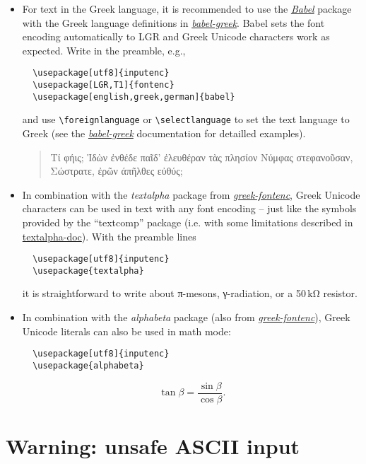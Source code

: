 \documentclass[a4paper]{article}
\begin{document}
{\begin{itemize}
\item
For text in the Greek language, it is recommended to use the
\href{http://www.ctan.org/pkg/babel}{\emph{Babel}} package with the Greek
language definitions in
\href{http://www.ctan.org/pkg/babel-greek}{\emph{babel-greek}}. Babel sets
the font encoding automatically to LGR and Greek Unicode characters work as
expected. Write in the preamble, e.g.,
%
\begin{verbatim}
  \usepackage[utf8]{inputenc}
  \usepackage[LGR,T1]{fontenc}
  \usepackage[english,greek,german]{babel}
\end{verbatim}
%
and use \verb+\foreignlanguage+ or \verb+\selectlanguage+ to set the text
language to Greek (see the
\href{http://www.ctan.org/pkg/babel-greek}{\emph{babel-greek}} documentation
for detailled examples).

\begin{quote}
  \greekscript
  Τί φήις; Ἱδὼν ἐνθέδε παῖδ’ ἐλευθέραν
  τὰς πλησίον Νύμφας στεφανοῦσαν, Σώστρατε,
  ἐρῶν άπῆλθες εὐθύς;
\end{quote}

\item
In combination with the \emph{textalpha} package from
\href{http://www.ctan.org/pkg/greek-fontenc}{\emph{greek-fontenc}}, Greek Unicode
characters can be used in text with any font encoding -- just like the
symbols provided by the ``textcomp'' package (i.e. with some limitations
described in
\href{http://mirrors.ctan.org/language/greek/greek-fontenc/textalpha-doc.pdf}%
{textalpha-doc}). With the preamble lines
%
\begin{verbatim}
  \usepackage[utf8]{inputenc}
  \usepackage{textalpha}
\end{verbatim}
%
it is straightforward to write about π-mesons, γ-radiation, or a 50\,kΩ
resistor.

\item
In combination with the \emph{alphabeta} package (also from
\href{http://www.ctan.org/pkg/greek-fontenc}{\emph{greek-fontenc}}),
Greek Unicode literals can also be used in math mode:
%
\begin{verbatim}
  \usepackage[utf8]{inputenc}
  \usepackage{alphabeta}
\end{verbatim}
\[
   \tan β = \frac{\sin β}{\cos β}.
\]

\end{itemize}

\section{Warning: unsafe ASCII input}

}
\end{document}
